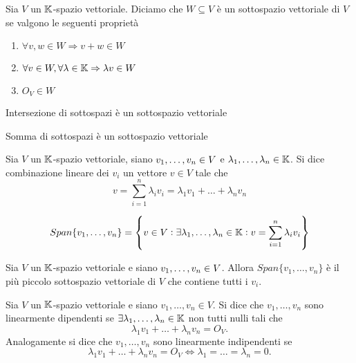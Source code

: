\begin{definition}
	Sia $ V $ un $ \mathbb{K} $-spazio vettoriale. Diciamo che $ W \subseteq V $ è un sottospazio vettoriale di $ V $ se valgono le seguenti proprietà
	\begin{enumerate}[label=(\roman*)]
		\item $ \forall v, w \in W \Rightarrow v + w \in W $
		\item $ \forall v \in W, \forall \lambda \in \mathbb{K} \Rightarrow \lambda v \in W $
		\item $ O_V \in W $
	\end{enumerate}
\end{definition}

\clearpage

\begin{thm}
	\textsf{Intersezione di sottospazi è un sottospazio vettoriale}
\end{thm}

\begin{thm}
	\textsf{Somma di sottospazi è un sottospazio vettoriale}
\end{thm}

\begin{definition}
	Sia $ V $ un $ \mathbb{K} $-spazio vettoriale, siano $ v_1, \ldots , v_n \in \nobreak V $ e $ \lambda_1, \ldots , \lambda_n \in \mathbb{K} $. Si dice combinazione lineare dei $ v_i $ un vettore $ v \in V $ tale che \[v = \sum_{i=1}^{n} \lambda_i v_i = \lambda_1 v_1 + \ldots + \lambda_n v_n \]
\end{definition}

\begin{definition}[span]
	\[Span\{v_1, \ldots , v_n\} = \left\{ v \in V: \exists \lambda_1, \ldots , \lambda_n \in \mathbb{K}: v = \sum_{i=1}^{n} \lambda_i v_i \right\}\]
\end{definition}

\begin{thm}
	Sia $ V $ un $ \mathbb{K} $-spazio vettoriale e siano $ v_1, \ldots , v_n \in \nolinebreak V $. Allora $ Span\{v_1, \ldots , v_n\} $ è il più piccolo sottospazio vettoriale di $ V $ che contiene tutti i $ v_i $.
\end{thm}

\begin{definition} 
	Sia $ V $ un $ \mathbb{K} $-spazio vettoriale e siano $ v_1, \ldots , v_n \in V $. Si dice che $ v_1, \ldots, v_n $ sono linearmente dipendenti se $ \exists \lambda_1, \ldots , \lambda_n \in \mathbb{K} $ non tutti nulli tali che \[\lambda_1 v_1 + \ldots + \lambda_n v_n = O_V.\] Analogamente si dice che $ v_1, \ldots, v_n $ sono linearmente indipendenti se \[\lambda_1 v_1 + \ldots + \lambda_n v_n = O_V \iff \lambda_1 = \ldots = \lambda_n = 0.\]	
\end{definition}


